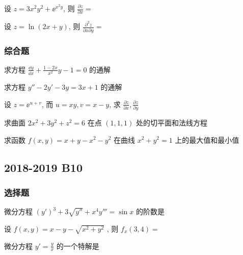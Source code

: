 \begin{ti}
	设 $z = 3 x^{2}y^{2} + \ee^{x^{2}y}$, 则 $\frac{\partial z}{\partial x} = $ \hua
\end{ti}

\begin{ti}
	设 $z = \ln(2x + y)$, 则 $\frac{\partial^{2}z}{\partial x \partial y} = $ \hua
\end{ti}

\subsubsection{综合题}
\begin{ti}
	求方程 $\frac{\dd{y}}{\dd{x}} + \frac{1 - 2x}{x^{2}} y - 1 = 0$ 的通解
\end{ti}

\begin{ti}
	求方程 $y'' - 2y' - 3y = 3x + 1$ 的通解
\end{ti}

\begin{ti}
	设 $z = \ee^{u + v}$, 而 $u = xy,v = x - y$, 求 $\frac{\partial z}{\partial x},\frac{\partial z}{\partial y}$
\end{ti}

\begin{ti}
	求曲面 $2x^{2} + 3y^{2} + z^{2} = 6$ 在点 $(1,1,1)$ 处的切平面和法线方程
\end{ti}

\begin{ti}
	求函数 $f(x,y) = x + y - x^{2} - y^{2}$ 在曲线 $x^{2} + y^{2} = 1$ 上的最大值和最小值
\end{ti}

\subsection{2018-2019 B10}
\subsubsection{选择题}
\begin{ti}
	微分方程 $(y')^3+3\sqrt{y''}+x^4y'''=\sin x$ 的阶数是\kuo
\end{ti}

\begin{ti}
	设 $f(x,y)=x-y-\sqrt{x^2+y^2}$ , 则 $f_{x}(3,4)=$\kuo
\end{ti}

\begin{ti}
	微分方程 $y'=\frac{y}{x}$ 的一个特解是\kuo
\end{ti}

